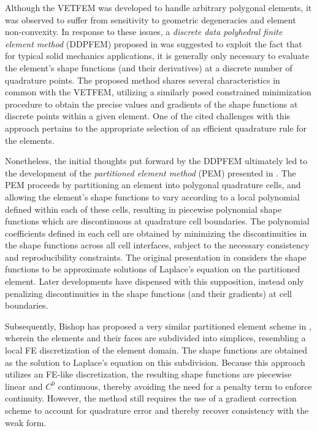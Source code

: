 		Although the VETFEM was developed to handle arbitrary polygonal elements, it was observed to suffer from sensitivity to geometric degeneracies and element non-convexity. In response to these issues, a \textit{discrete data polyhedral finite element method} (DDPFEM) proposed in \cite{Selimotic:08} was suggested to exploit the fact that for typical solid mechanics applications, it is generally only necessary to evaluate the element's shape functions (and their derivatives) at a discrete number of quadrature points. The proposed method shares several characteristics in common with the VETFEM, utilizing a similarly posed constrained minimization procedure to obtain the precise values and gradients of the shape functions at discrete points within a given element. One of the cited challenges with this approach pertains to the appropriate selection of an efficient quadrature rule for the elements.
			
		Nonetheless, the initial thoughts put forward by the DDPFEM ultimately led to the development of the \textit{partitioned element method} (PEM) presented in \cite{Rashid:12}. The PEM proceeds by partitioning an element into polygonal quadrature cells, and allowing the element's shape functions to vary according to a local polynomial defined within each of these cells, resulting in piecewise polynomial shape functions which are discontinuous at quadrature cell boundaries. The polynomial coefficients defined in each cell are obtained by minimizing the discontinuities in the shape functions across all cell interfaces, subject to the necessary consistency and reproducibility constraints. The original presentation in \cite{Rashid:12} considers the shape functions to be approximate solutions of Laplace's equation on the partitioned element. Later developments have dispensed with this supposition, instead only penalizing discontinuities in the shape functions (and their gradients) at cell boundaries.
			
		Subsequently, Bishop has proposed a very similar partitioned element scheme in \cite{Bishop:14}, wherein the elements and their faces are subdivided into simplices, resembling a local FE discretization of the element domain. The shape functions are obtained as the solution to Laplace's equation on this subdivision. Because this approach utilizes an FE-like discretization, the resulting shape functions are piecewise linear and $C^0$ continuous, thereby avoiding the need for a penalty term to enforce continuity. However, the method still requires the use of a gradient correction scheme to account for quadrature error and thereby recover consistency with the weak form.

